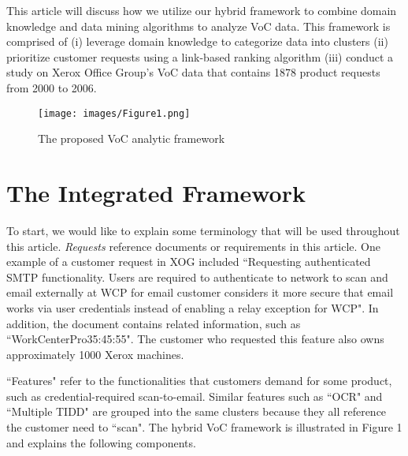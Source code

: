 \documentclass[sigconf]{acmart}
\begin{document}
This article will discuss how we utilize our hybrid framework to combine domain knowledge and data mining algorithms to analyze VoC data. This framework is comprised of (i) leverage domain knowledge to categorize data into clusters (ii) prioritize customer requests using a link-based ranking algorithm (iii) conduct a study on Xerox Office Group's VoC data that contains 1878 product requests from 2000 to 2006. 

\begin{figure*}[!b]
    \centering
    \texttt{[image: images/Figure1.png]}
    \caption{The proposed VoC analytic framework}
    \label{fig:1}
\end{figure*}

\section{The Integrated Framework}
To start, we would like to explain some terminology that will be used throughout this article. \textit{Requests} reference documents or requirements in this article. One example of a customer request in XOG included ``Requesting authenticated SMTP functionality. Users are required to authenticate to network to scan and email externally at WCP for email customer considers it more secure that email works via user credentials instead of enabling a relay exception for WCP". In addition, the document contains related information, such as ``WorkCenterPro35:45:55". The customer who requested this feature also owns approximately 1000 Xerox machines. 

``Features" refer to the functionalities that customers demand for some product, such as credential-required scan-to-email. Similar features such as ``OCR" and ``Multiple TIDD" are grouped into the same clusters because they all reference the customer need to ``scan". The hybrid VoC framework is illustrated in Figure 1 and explains the following components.
\end{document}
